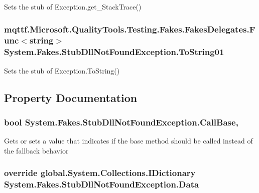 Sets the stub of Exception.\-get\-\_\-\-Stack\-Trace()

\hypertarget{class_system_1_1_fakes_1_1_stub_dll_not_found_exception_a8eff20aba0c58250d8e389cccbbebad1}{
\subsubsection[{To\-String01}]{\setlength{\rightskip}{0pt plus 5cm}mqttf.\-Microsoft.\-Quality\-Tools.\-Testing.\-Fakes.\-Fakes\-Delegates.\-Func$<$string$>$ System.\-Fakes.\-Stub\-Dll\-Not\-Found\-Exception.\-To\-String01}}\label{class_system_1_1_fakes_1_1_stub_dll_not_found_exception_a8eff20aba0c58250d8e389cccbbebad1}


Sets the stub of Exception.\-To\-String()



\subsection{Property Documentation}
\hypertarget{class_system_1_1_fakes_1_1_stub_dll_not_found_exception_a5b44d63ed8fae79d758ee4a0cacc5ebe}{
\subsubsection[{Call\-Base}]{\setlength{\rightskip}{0pt plus 5cm}bool System.\-Fakes.\-Stub\-Dll\-Not\-Found\-Exception.\-Call\-Base\hspace{0.3cm}{\ttfamily [get]}, {\ttfamily [set]}}}\label{class_system_1_1_fakes_1_1_stub_dll_not_found_exception_a5b44d63ed8fae79d758ee4a0cacc5ebe}


Gets or sets a value that indicates if the base method should be called instead of the fallback behavior

\hypertarget{class_system_1_1_fakes_1_1_stub_dll_not_found_exception_ab30ca5734f3c97622ddc2bce910ad74a}{
\subsubsection[{Data}]{\setlength{\rightskip}{0pt plus 5cm}override global.\-System.\-Collections.\-I\-Dictionary System.\-Fakes.\-Stub\-Dll\-Not\-Found\-Exception.\-Data\hspace{0.3cm}{\ttfamily [get]}}}\label{class_system_1_1_fakes_1_1_stub_dll_not_found_exception_ab30ca5734f3c97622ddc2bce910ad74a}


